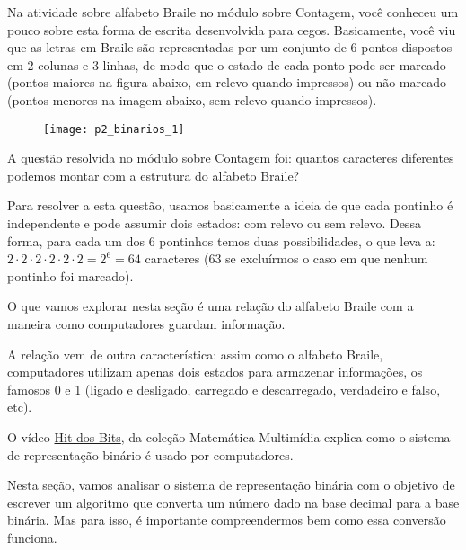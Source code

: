 Na atividade sobre alfabeto Braile no módulo sobre Contagem, você conheceu um pouco sobre esta forma de escrita desenvolvida para cegos. Basicamente, você viu que as letras em Braile são representadas por um conjunto de 6 pontos dispostos em 2 colunas e 3 linhas, de modo que o estado de cada ponto pode ser marcado (pontos maiores na figura abaixo, em relevo quando impressos) ou não marcado (pontos menores na imagem abaixo, sem relevo quando impressos).

\begin{figure}[H]
\centering

\texttt{[image: p2\_binarios\_1]}
\end{figure}

A questão resolvida no módulo sobre Contagem foi: quantos caracteres diferentes podemos montar com a estrutura do alfabeto Braile?

Para resolver a esta questão, usamos basicamente a ideia de que cada pontinho é independente e pode assumir dois estados: com relevo ou sem relevo. Dessa forma, para cada um dos 6 pontinhos temos duas possibilidades, o que leva a: $2\cdot2\cdot2\cdot2\cdot2\cdot2=2^6=64$ caracteres ($63$ se excluírmos o caso em que nenhum pontinho foi marcado).

O que vamos explorar nesta seção é uma relação do alfabeto Braile com a maneira como computadores guardam informação.

A relação vem de outra característica: assim como o alfabeto Braile, computadores utilizam apenas dois estados para armazenar informações, os famosos 0 e 1 (ligado e desligado, carregado e descarregado, verdadeiro e falso, etc).

O vídeo \href{https://m3.ime.unicamp.br/recursos/1116}{Hit dos Bits}, da coleção Matemática Multimídia explica como o sistema de representação binário é usado por computadores.

Nesta seção, vamos analisar o sistema de representação binária com o objetivo de escrever um algoritmo que converta um número dado na base decimal para a base binária. Mas para isso, é importante compreendermos bem como essa conversão funciona.

